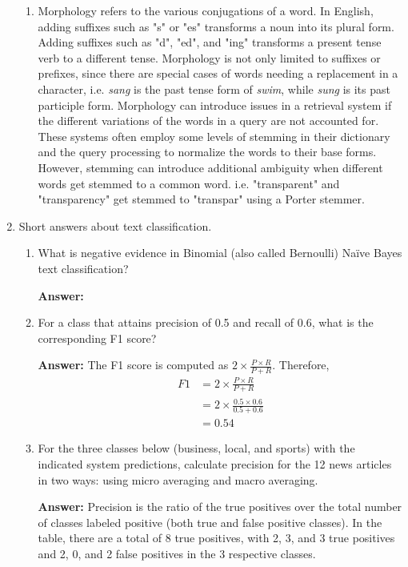 \documentclass[11pt]{article}
\begin{document}
\begin{enumerate}
\begin{enumerate}
          \item Morphology refers to the various conjugations of a word. In English, adding suffixes such as "s" or "es" transforms a noun into its plural form. Adding suffixes such as "d", "ed", and "ing" transforms a present tense verb to a different tense. Morphology is not only limited to suffixes or prefixes, since there are special cases of words needing a replacement in a character, i.e. \textit{sang} is the past tense form of \textit{swim}, while \textit{sung} is its past participle form.
                Morphology can introduce issues in a retrieval system if the different variations of the words in a query are not accounted for. These systems often employ some levels of stemming in their dictionary and the query processing to normalize the words to their base forms. However, stemming can introduce additional ambiguity when different words get stemmed to a common word. i.e. "transparent" and "transparency" get stemmed to "transpar" using a Porter stemmer.
        \end{enumerate}

  \item Short answers about text classification.
        \begin{enumerate}
          \item What is negative evidence in Binomial (also called Bernoulli) Naïve Bayes text classification?

                \textbf{Answer:}

          \item For a class that attains precision of 0.5 and recall of 0.6, what is the corresponding F1 score?

                \textbf{Answer:} The F1 score is computed as $2 \times \frac{P\times R}{P+R}$. Therefore,
                \begin{align*}
                  F1 & = 2 \times \frac{P\times R}{P+R}         \\
                     & = 2 \times \frac{0.5\times 0.6}{0.5+0.6} \\
                     & = 0.54
                \end{align*}

          \item For the three classes below (business, local, and sports) with the indicated system predictions, calculate precision for the 12 news articles in two ways: using micro averaging and macro averaging.

                \textbf{Answer:} Precision is the ratio of the true positives over the total number of classes labeled positive (both true and false positive classes). In the table, there are a total of 8 true positives, with 2, 3, and 3 true positives and 2, 0, and 2 false positives in the 3 respective classes.


\end{enumerate}
\end{enumerate}
\end{document}
